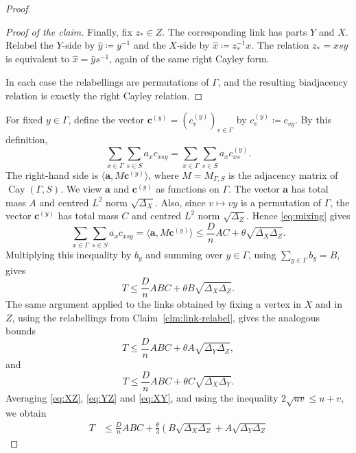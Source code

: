 \documentclass[10pt]{article}
\numberwithin{equation}{section}
\DeclareMathOperator{\Cay}{Cay}
\begin{document}
\begin{proof}
\begin{proof}[Proof of the claim]
Finally, fix $z_\ast\in Z$. The corresponding link has parts $Y$ and $X$. Relabel the $Y$-side by $\hat{y}\coloneqq y^{-1}$ and the $X$-side by $\hat{x}\coloneqq z_\ast^{-1}x$. The relation $z_\ast=xsy$ is equivalent to $\hat{x}=\hat{y}s^{-1}$, again of the same right Cayley form. 

In each case the relabellings are permutations of $\Gamma$, and the resulting biadjacency relation is exactly the right Cayley relation.
\end{proof}

For fixed $y\in\Gamma$, define the vector $\mathbf{c}^{(y)}=(c^{(y)}_v)_{v\in\Gamma}$ by $c^{(y)}_v\coloneqq c_{vy}$. By this definition,
\[
        \sum_{x\in\Gamma}\sum_{s\in S}a_xc_{xsy} = \sum_{x\in\Gamma}\sum_{s\in S}a_xc^{(y)}_{xs}.
\]
The right-hand side is $\langle \mathbf{a},M\mathbf{c}^{(y)}\rangle$, where $M=M_{\Gamma,S}$ is the adjacency matrix of $\Cay(\Gamma,S)$. We view $\mathbf{a}$ and $\mathbf{c}^{(y)}$ as functions on $\Gamma$. The vector $\mathbf{a}$ has total mass $A$ and centred $L^2$ norm $\sqrt{\Delta_X}$. Also, since $v\mapsto vy$ is a permutation of $\Gamma$, the vector $\mathbf{c}^{(y)}$ has total mass $C$ and centred $L^2$ norm $\sqrt{\Delta_Z}$. Hence \eqref{eq:mixing} gives
\[
        \sum_{x\in\Gamma}\sum_{s\in S}a_xc_{xsy}
        = \langle \mathbf{a},M\mathbf{c}^{(y)}\rangle
        \le \frac{D}{n}AC+\theta\sqrt{\Delta_X\Delta_Z}.
\]
Multiplying this inequality by $b_y$ and summing over $y\in\Gamma$, using $\sum_{y\in\Gamma} b_y=B$, gives
\begin{equation}
        T\le \frac{D}{n}ABC+\theta B\sqrt{\Delta_X\Delta_Z}.
        \label{eq:XZ}
\end{equation}
The same argument applied to the links obtained by fixing a vertex in $X$ and in $Z$, using the relabellings from Claim~\ref{clm:link-relabel}, gives the analogous bounds
\begin{equation}
        T\le \frac{D}{n}ABC+\theta A\sqrt{\Delta_Y\Delta_Z},
        \label{eq:YZ}
\end{equation}
and
\begin{equation}
        T\le \frac{D}{n}ABC+\theta C\sqrt{\Delta_X\Delta_Y}.
        \label{eq:XY}
\end{equation}
Averaging \eqref{eq:XZ}, \eqref{eq:YZ} and \eqref{eq:XY}, and using the inequality $2\sqrt{uv}\le u+v$, we obtain
\begin{align*}
        T
        &\le \frac{D}{n}ABC
        +\frac{\theta}{3}
        \left(
        B\sqrt{\Delta_X\Delta_Z}
        +A\sqrt{\Delta_Y\Delta_Z}

\end{align*}
\end{proof}
\end{document}
